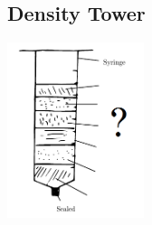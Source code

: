 \pagebreak


\subsection{Density Tower} 

\begin{center}
\includegraphics[width=0.3\textwidth]{./img/density-tower-sci-meth.png}
\end{center}

